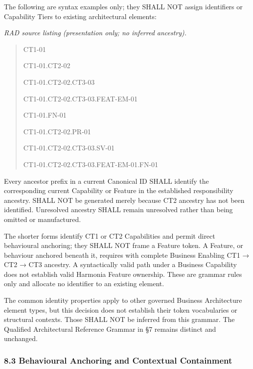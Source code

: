 \label{rad:metamodel:366}

The following are syntax examples only; they SHALL NOT assign identifiers or Capability Tiers to existing architectural elements:

\label{rad:metamodel:368}

\textit{RAD source listing (presentation only; no inferred ancestry).}
\begin{quote}
CT1-01

CT1-01.CT2-02

CT1-01.CT2-02.CT3-03

CT1-01.CT2-02.CT3-03.FEAT-EM-01

CT1-01.FN-01

CT1-01.CT2-02.PR-01

CT1-01.CT2-02.CT3-03.SV-01

CT1-01.CT2-02.CT3-03.FEAT-EM-01.FN-01
\end{quote}
\label{rad:metamodel:379}

Every ancestor prefix in a current Canonical ID SHALL identify the corresponding current Capability or Feature in the established responsibility ancestry. \texttt{} SHALL NOT be generated merely because CT2 ancestry has not been identified. Unresolved ancestry SHALL remain unresolved rather than being omitted or manufactured.

\label{rad:metamodel:381}

The shorter \texttt{} forms identify CT1 or CT2 Capabilities and permit direct behavioural anchoring; they SHALL NOT frame a Feature token. A Feature, or behaviour anchored beneath it, requires \texttt{} with complete Business Enabling CT1 → CT2 → CT3 ancestry. A syntactically valid path under a Business Capability does not establish valid Harmonia Feature ownership. These are grammar rules only and allocate no identifier to an existing element.

\label{rad:metamodel:383}

The common identity properties apply to other governed Business Architecture element types, but this decision does not establish their token vocabularies or structural contexts. Those SHALL NOT be inferred from this grammar. The Qualified Architectural Reference Grammar in §7 remains distinct and unchanged.

\label{rad:metamodel:385}
\subsubsection*{8.3 Behavioural Anchoring and Contextual Containment}
\label{rad:metamodel:387}

